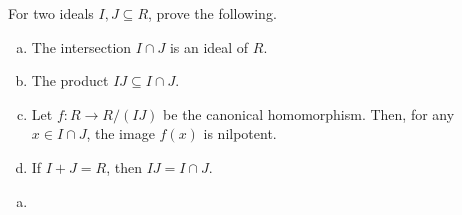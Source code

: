 \documentclass[10pt]{mypackage}
\begin{document}
\RaggedRight
\begin{problem}[Problem 1]
  For two ideals $I,J\subseteq R$, prove the following.
  \begin{enumerate}[(a)]
    \item The intersection $I\cap J$ is an ideal of $R$.
    \item The product $IJ\subseteq I\cap J$.
    \item Let $f\colon R\rightarrow R/(IJ)$ be the canonical homomorphism. Then, for any $x\in I\cap J$, the image $f(x)$ is nilpotent.
    \item If $I + J = R$, then $IJ = I\cap J$.
  \end{enumerate}
\end{problem}
\begin{solution}\hfill
  \begin{enumerate}[(a)]
    \item 
  \end{enumerate}
\end{solution}
\end{document}
